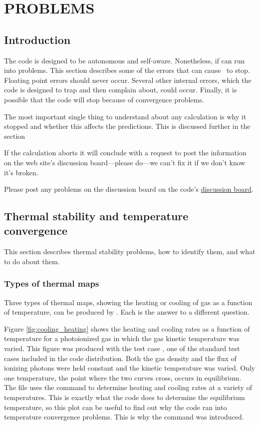 \chapter{PROBLEMS}

\section{Introduction}

The code is designed to be autonomous and self-aware.
Nonetheless, if can run into problems.
This section describes some of the errors that can cause
\Cloudy\ to stop.
Floating point errors should never occur.
Several other internal errors, which the code is designed to trap
and then complain about, could occur.
Finally, it is possible that the code will stop because of
convergence problems.

The most important single thing to understand about any calculation is
why it stopped and whether this affects the predictions.
This is discussed
further in the section 

If the calculation aborts it will conclude with a request to post the
information on the web site's discussion board---please do---we can't fix
it if we don't know it's broken.

Please post any problems on the discussion board on the code's
\href{https://cloudyastrophysics.groups.io}{discussion board}.

\section{Thermal stability and temperature convergence}
\label{sec:ThermalStabilityProblems}

This section describes thermal stability problems, how to identify them,
and what to do about them.

\subsection{Types of thermal maps}

Three types of thermal maps, showing the heating or cooling of gas as
a function of temperature, can be produced by \Cloudy.  Each is the answer
to a different question.

Figure \ref{fig:cooling_heating} shows the heating and cooling
rates as a function of temperature
for a photoionized gas in which the gas kinetic temperature was varied.
This figure was produced with the test case ,
one of the standard
test cases included in the code distribution.
Both the gas density and
the flux of ionizing photons were held constant and the kinetic temperature
was varied.
Only one temperature, the point where the two curves cross,
occurs in equilibrium.
The  file uses the
 command
to determine heating and cooling rates at a variety of temperatures.
This
is exactly what the code does to determine the equilibrium temperature,
so this plot can be useful to find out why the code ran into temperature
convergence problems.
This is why the command was introduced.

